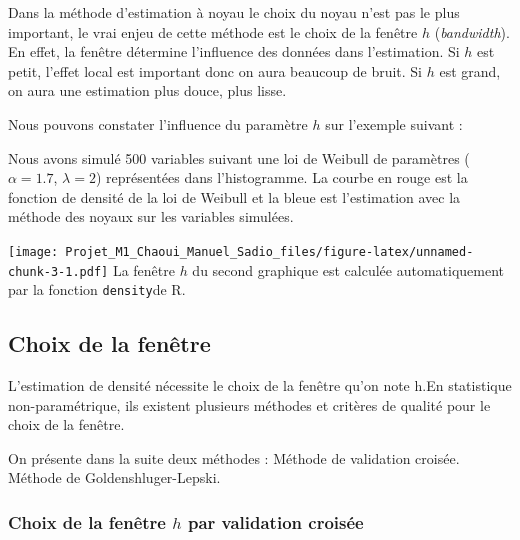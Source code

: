 \documentclass[
]{book}
\begin{document}
Dans la méthode d'estimation à noyau le choix du noyau n'est pas le plus important, le vrai enjeu de cette méthode est le choix de la fenêtre \(h\) (\emph{bandwidth}).
En effet, la fenêtre détermine l'influence des données dans l'estimation. Si \(h\) est petit, l'effet local est important donc on aura beaucoup de bruit. Si \(h\) est grand, on aura une estimation plus douce, plus lisse.

Nous pouvons constater l'influence du paramètre \(h\) sur l'exemple suivant :

Nous avons simulé 500 variables suivant une loi de Weibull de paramètres (\(\alpha = 1.7\), \(\lambda=2\)) représentées dans l'histogramme. La courbe en rouge est la fonction de densité de la loi de Weibull et la bleue est l'estimation avec la méthode des noyaux sur les variables simulées.

\texttt{[image: Projet\_M1\_Chaoui\_Manuel\_Sadio\_files/figure-latex/unnamed-chunk-3-1.pdf]}
La fenêtre \(h\) du second graphique est calculée automatiquement par la fonction \texttt{density}de R.

\hypertarget{choix-de-la-fenuxeatre}{%
\subsection{Choix de la fenêtre}\label{choix-de-la-fenuxeatre}}

L'estimation de densité nécessite le choix de la fenêtre qu'on note h.\newline En statistique non-paramétrique, ils existent plusieurs méthodes et critères de qualité pour le choix de la fenêtre.\newline

On présente dans la suite deux méthodes :\newline
\hspace*{0.5cm} Méthode de validation croisée.\newline
\hspace*{0.5cm} Méthode de Goldenshluger-Lepski.\newline

\hypertarget{choix-de-la-fenuxeatre-h-par-validation-croisuxe9e}{%
\subsubsection{\texorpdfstring{Choix de la fenêtre \(h\) par validation croisée}{Choix de la fenêtre h par validation croisée}}\label{choix-de-la-fenuxeatre-h-par-validation-croisuxe9e}}
\end{document}
